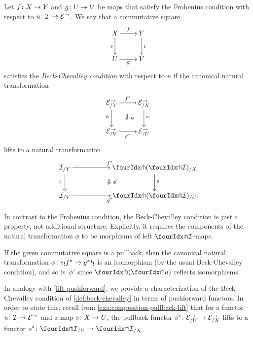 \documentclass[reqno,10pt,a4paper,oneside,draft]{amsart}
\begin{document}
\begin{definition} \label{def:beck-chevalley}
Let $f \colon X \to Y$ and $g \colon U \to V$ be maps that satisfy the Frobenius condition with respect to $u \colon \mathcal{I} \to \mathcal{E}^\to$.
We say that a commutative square
\begin{equation} \label{def:beck-chevalley:0}
\begin{gathered}
\xymatrix{
  X
  \ar[r]^{f}
  \ar[d]_{s}
&
  Y
  \ar[d]^{t}
\\
  U
  \ar[r]_{g}
&
  V
}
\end{gathered}
\end{equation}
satisfies the \emph{Beck-Chevalley condition} with respect to $u$ if the canonical natural transformation
\[
\xymatrix{
  \catE^\to_{/Y}
  \ar[d]_{t_!}
  \ar[r]^{f^*}
  \ar@{}[dr]|{\textstyle\Downarrow \rlap{$\labelstyle\phi$}}
&
  \catE^\to_{/X}
  \ar[d]^{s_!}
\\
  \catE^\to_{/V}
  \ar[r]_{g^*}
&
  \catE^\to_{/U}
}
\]
lifts to a natural transformation
\[
\xymatrix@C+3em{
  \cal{I}_{/Y}
  \ar[r]^{f^*}
  \ar[d]_{t_!}
  \ar@{}[dr]|{\textstyle\Downarrow \rlap{$\labelstyle\phi'$}}
&
  \liftl{(\liftr{\cal{I}})}_{/X}
  \ar[d]^{s_!}
\\
  \cal{I}_{/V}
  \ar[r]_{g^*}
&
  \liftl{(\liftr{\cal{I}})}_{/U}
\rlap{.}}
\]
\end{definition}

\begin{remark} \label{beck-chevalley-no-coherence}
In contrast to the Frobenius condition, the Beck-Chevalley condition is just a property, not additional structure.
Explicitly, it requires the components of the natural transformation $\phi$ to be morphisms of left $\liftr{\cal{I}}$-maps.
\end{remark}

\begin{remark} \label{beck-chevalley-iso}
If the given commutative square is a pullback, then the canonical natural transformation $\phi \colon s_! f^* \to g^* t_!$ is an isomorphism (by the usual Beck-Chevalley condition), and so is~$\phi'$ since $\liftl{(\liftr{u})}$ reflects isomorphisms.
\end{remark}

In analogy with \cref{lift-pushforward}, we provide a characterization of the Beck-Chevalley condition of \cref{def:beck-chevalley} in terms of pushforward functors.
In order to state this, recall from \cref{exa:composition-pullback-lift} that for a functor $u \colon \mathcal{I} \to \mathcal{E}^\to$ and a map $s \colon X \to U$, the pullback functor $s^* \colon \mathcal{E}^\to_{/U} \to \mathcal{E}^\to_{/X}$ lifts to a functor $s^* \co {\liftr{\cal{I}}}_{/U} \to {\liftr{\cal{I}}}_{/X}$.
\end{document}
